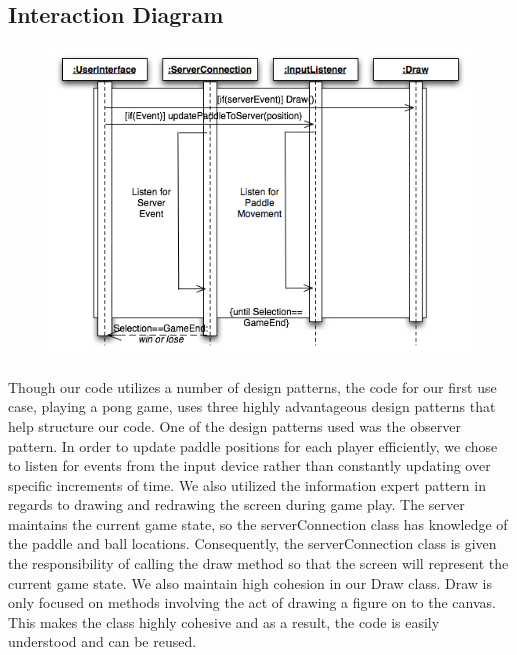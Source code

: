 \documentclass[12pt]{article}
\begin{document}

\subsection{Interaction Diagram}
\begin{figure}
\begin{center}
\includegraphics[scale=.7]{InteractionDiagram.png}
\caption{\label{InteractionDiagram}}
\end{center}
\end{figure}
Though our code utilizes a number of design patterns, the code for our first use case, playing a pong
game, uses three highly advantageous design patterns that help structure our code.
One of the design patterns used was the observer pattern.  In order to update paddle positions for each
player efficiently, we chose to listen for events from the input device rather than constantly updating
over specific increments of time.  We also utilized the information expert pattern in regards to drawing
and redrawing the screen during game play.  The server maintains the current game state, so the
serverConnection class has knowledge of the paddle and ball locations.  Consequently, the serverConnection
class is given the responsibility of calling the draw method so that the screen will represent the
current game state.  We also maintain high cohesion in our Draw class.  Draw is only focused on methods
involving the act of drawing a figure on to the canvas.  This makes the class highly cohesive and as a
result, the code is easily understood and can be reused.
\end{document}
